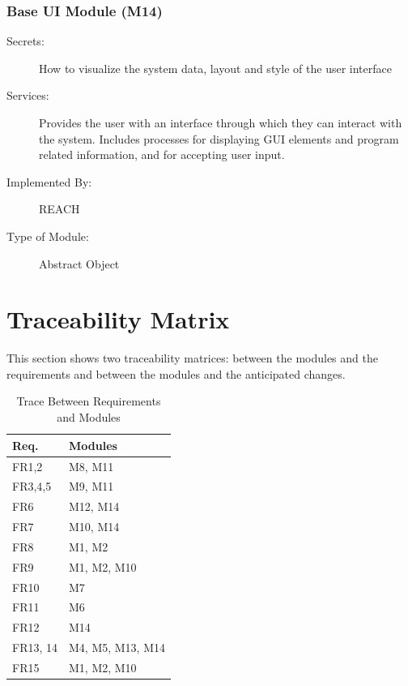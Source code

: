 \documentclass[12pt, titlepage]{article}
\begin{document}
\subsubsection{Base UI Module (M14)}
\begin{description}
\item[Secrets:] How to visualize the system data, layout and style of the user interface
\item[Services:] Provides the user with an interface through which they can interact with the system. Includes processes for displaying GUI elements and program related information, and for accepting user input.
\item[Implemented By:] REACH
\item[Type of Module:] Abstract Object \\
\end{description}

\section{Traceability Matrix} \label{SecTM}

This section shows two traceability matrices: between the modules and the
requirements and between the modules and the anticipated changes.

\begin{table}[H]
\centering
\begin{tabular}{p{} p{}}
\toprule
\textbf{Req.} & \textbf{Modules}\\
\midrule
FR1,2 & M8, M11\\
FR3,4,5 & M9, M11\\
FR6 & M12, M14\\
FR7 & M10, M14\\
FR8 & M1, M2\\
FR9 & M1, M2, M10\\
FR10 & M7\\
FR11 & M6\\
FR12 & M14\\
FR13, 14 & M4, M5, M13, M14\\
FR15 & M1, M2, M10\\
\bottomrule
\end{tabular}
\caption{Trace Between Requirements and Modules}
\label{TblRT}
\end{table}
\end{document}
